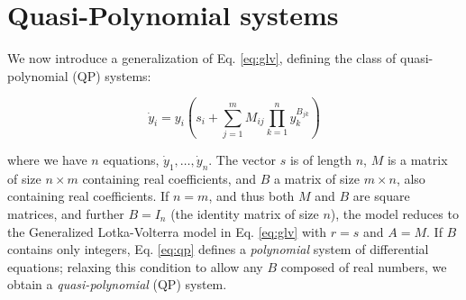 \documentclass{article}
\begin{document}
\hypertarget{quasi-polynomial-systems}{%
\section{Quasi-Polynomial systems}\label{quasi-polynomial-systems}}

\label{sec:qp}

We now introduce a generalization of Eq. \ref{eq:glv}, defining the
class of quasi-polynomial (QP) systems:

\begin{equation}
\label{eq:qp}
\dot{y}_i = y_i \left( s_i + \sum_{j = 1}^m M_{ij} \prod_{k = 1}^n y_k^{B_{jk}} \right)
\end{equation}

where we have \(n\) equations, \(\dot{y}_1, \ldots, \dot{y}_n\). The
vector \(s\) is of length \(n\), \(M\) is a matrix of size
\(n \times m\) containing real coefficients, and \(B\) a matrix of size
\(m \times n\), also containing real coefficients. If \(n = m\), and
thus both \(M\) and \(B\) are square matrices, and further \(B=I_n\)
(the identity matrix of size \(n\)), the model reduces to the
Generalized Lotka-Volterra model in Eq. \ref{eq:glv} with \(r = s\) and
\(A = M\). If \(B\) contains only integers, Eq. \ref{eq:qp} defines a
\emph{polynomial} system of differential equations; relaxing this
condition to allow any \(B\) composed of real numbers, we obtain a
\emph{quasi-polynomial} (QP) system.
\end{document}
